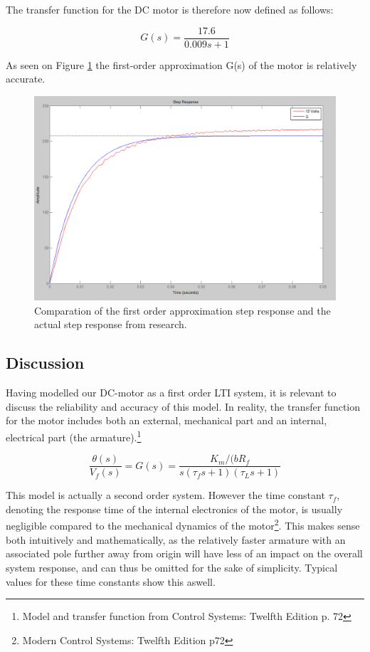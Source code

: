 The transfer function for the DC motor is therefore now defined as follows:

\begin{equation}
G(s)=\frac{17.6}{0.009s+1}
\end{equation}

As seen on Figure \ref{fig:FirstOrderApproximation} the first-order approximation G(s) of the motor is relatively accurate.

\begin{figure}[h!]
\centering
\includegraphics[scale=0.35]{Billeder/FirstOrderApproximation.png}
\caption{Comparation of the first order approximation step response and the actual step response from research.}
\label{fig:FirstOrderApproximation}
\end{figure}

\subsection{Discussion}
Having modelled our DC-motor as a first order LTI system, it is relevant to discuss the reliability and accuracy of this model. In reality, the transfer function for the motor includes both an external, mechanical part and an internal, electrical part (the armature).\footnote{Model and transfer function from Control Systems: Twelfth Edition p. 72}

\begin{equation}
\frac{\theta(s)}{V_f (s)}=G(s)=\frac{K_m / (bR_f}{s(\tau_f s+1)(\tau_L s+1)}
\end{equation}

This model is actually a second order system. However the time constant $\tau_f$, denoting the response time of the internal electronics of the motor, is usually negligible compared to the mechanical dynamics of the motor\footnote{Modern Control Systems: Twelfth Edition p72}. This makes sense both intuitively and mathematically, as the relatively faster armature with an associated pole further away from origin will have less of an impact on the overall system response, and can thus be omitted for the sake of simplicity. Typical values for these time constants show this aswell.

